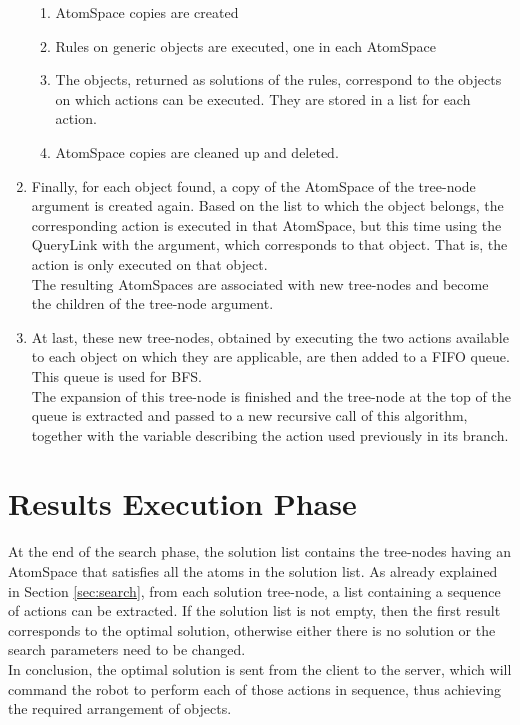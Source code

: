 \begin{enumerate}
	\begin{enumerate}
		\item AtomSpace copies are created
		\item Rules on generic objects are executed, one in each AtomSpace
		\item The objects, returned as solutions of the rules, correspond to the objects on which actions can be executed. They are stored in a list for each action.
		\item AtomSpace copies are cleaned up and deleted.
	\end{enumerate}

	\item Finally, for each object found, a copy of the AtomSpace of the tree-node argument is created again. Based on the list to which the object belongs, the corresponding action is executed in that AtomSpace, but this time using the QueryLink with the argument, which corresponds to that object. That is, the action is only executed on that object. \\
The resulting AtomSpaces are associated with new tree-nodes and become the children of the tree-node argument.
	
	\item At last, these new tree-nodes, obtained by executing the two actions available to each object on which they are applicable, are then added to a FIFO queue.
This queue is used for BFS. \\
The expansion of this tree-node is finished and the tree-node at the top of the queue is extracted and passed to a new recursive call of this algorithm, together with the variable describing the action used previously in its branch. 
\end{enumerate}


\section{Results Execution Phase}\label{sec:results_exec}

At the end of the search phase, the solution list contains the tree-nodes having an AtomSpace that satisfies all the atoms in the solution list.
As already explained in Section \ref{sec:search}, from each solution tree-node, a list containing a sequence of actions can be extracted.
If the solution list is not empty, then the first result corresponds to the optimal solution, otherwise either there is no solution or the search parameters need to be changed. \\
In conclusion, the optimal solution is sent from the client to the server, which will command the robot to perform each of those actions in sequence, thus achieving the required arrangement of objects.

